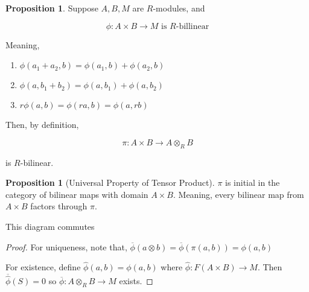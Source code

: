 \documentclass{article}
\theoremstyle{definition}
\newtheorem{proposition}[theorem]{Proposition}
\begin{document}
\begin{proposition}
    Suppose \(A,B,M\) are \(R\)-modules, and

    \[
        \phi : A \times B \to M \text{ is \(R\)-billinear} 
    \]

    Meaning,

    \begin{enumerate}[label=\arabic*)]
        \item \(\phi(a_1 + a_2,b) = \phi(a_1,b) + \phi(a_2,b)\)
        \item \(\phi(a,b_1 + b_2) = \phi(a,b_1)+\phi(a,b_2)\)
        \item \(r\phi(a,b) = \phi(ra,b) = \phi(a,rb)\)  
    \end{enumerate}
    
    Then, by definition,

    \[
        \pi: A \times B \to A \otimes _ R B
    \]

    is \(R\)-bilinear. 
\end{proposition}

\begin{proposition}
    [Universal Property of Tensor Product]

    \(\pi\) is initial in the category of bilinear maps with domain \(A \times B\). Meaning, every bilinear map from \(A \times B\) factors through \(\pi\). 


    \begin{center}


    This diagram commutes

    \end{center}

\end{proposition}

\begin{proof}
    For uniqueness, note that, \(\overline{\phi}(a \otimes b) = \overline{\phi}(\pi(a,b))=\phi(a,b)\) 

    For existence, define \(\hat{\phi} (a,b) = \phi (a,b)\) where \(\hat{\phi} : F(A \times B) \to M\). Then \(\overline{\hat{\phi}}(S) = 0\) so \(\overline{\phi}: A \otimes _R B \to M\) exists.  
\end{proof}
\end{document}
